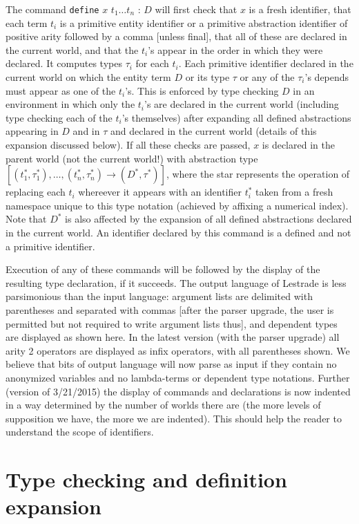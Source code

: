 The command {\tt define} $x$ $t_1\ldots t_n$ : $D$  will first check that $x$ is a fresh identifier, that each term $t_i$ is a primitive entity identifier or a primitive abstraction identifier of positive arity followed by a comma [unless final],  that all of these are declared in the current world, and that the $t_i$'s appear in the order in which they were declared.  It computes types $\tau_i$ for each $t_i$.   Each primitive identifier declared in the current world on which the entity term $D$ or its type $\tau$
or any of the $\tau_i$'s depends must appear as one of the $t_i$'s.   This is enforced by type checking $D$ in an environment in which only the $t_i$'s are declared in the current world (including type checking each of the $t_i$'s themselves)  after expanding all defined abstractions appearing in $D$ and in $\tau$ and declared in the current world (details of this expansion discussed below).   If all these checks are passed, $x$ is declared in the parent world (not the current world!) with abstraction type $[(t_1^*,\tau_1^*),\ldots,(t_n^*,\tau_n^*)\rightarrow (D^*,\tau^*)]$, where the star
represents the operation of replacing each $t_i$ whereever it appears with an identifier $t_i^*$ taken from a fresh namespace unique to this type notation (achieved by affixing a numerical index).   Note that $D^*$ is also affected by the expansion of all defined abstractions declared in the current world.   An identifier declared by this command is a defined and not a primitive identifier.

Execution of any of these commands will be followed by the display of the resulting type declaration, if it succeeds.   The output language of Lestrade is less parsimonious than the input language:  argument lists are delimited with parentheses and separated with commas [after the parser upgrade, the user is permitted but not required to write argument lists thus], and dependent types are displayed as shown here.  In the latest version (with the parser upgrade) all arity 2 operators are displayed as infix operators, with all parentheses shown.   We believe that bits of output language will now parse as input if they contain no anonymized variables and no lambda-terms or dependent type notations.   Further (version of 3/21/2015) the display of commands and declarations is now indented in a way determined by the number of worlds there are (the more levels of supposition we have, the more we are indented).  This should help the reader to understand the scope of identifiers.

\section{Type checking and definition expansion}


